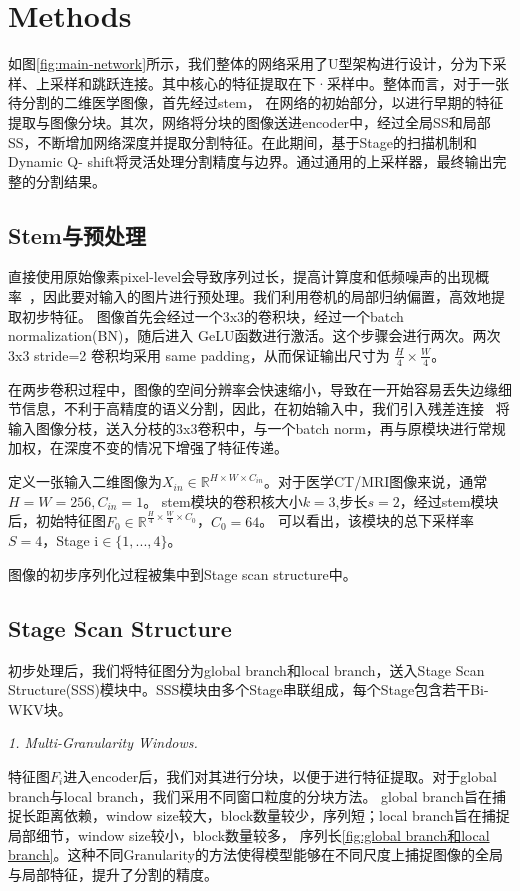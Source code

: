 \documentclass[conference]{IEEEtran}   %
\begin{document}
\section{Methods}
如图\ref{fig:main-network}所示，我们整体的网络采用了U型架构进行设计，分为下采样、上采样和跳跃连接。其中核心的特征提取在下·采样中。整体而言，对于一张待分割的二维医学图像，首先经过stem，
在网络的初始部分，以进行早期的特征提取与图像分块。其次，网络将分块的图像送进encoder中，经过全局SS和局部SS，不断增加网络深度并提取分割特征。在此期间，基于Stage的扫描机制和Dynamic Q-
shift将灵活处理分割精度与边界。通过通用的上采样器，最终输出完整的分割结果。
\subsection{Stem与预处理}
直接使用原始像素pixel-level会导致序列过长，提高计算度和低频噪声的出现概率~\cite{vit}，因此要对输入的图片进行预处理。我们利用卷机的局部归纳偏置，高效地提取初步特征。
图像首先会经过一个3x3的卷积块，经过一个batch normalization(BN)，随后进入
GeLU函数进行激活。这个步骤会进行两次。两次 3x3 stride=2 卷积均采用 same padding，从而保证输出尺寸为 $\frac{H}{4}\times\frac{W}{4}$。

在两步卷积过程中，图像的空间分辨率会快速缩小，导致在一开始容易丢失边缘细节信息，不利于高精度的语义分割，因此，在初始输入中，我们引入残差连接
~\cite{resnet}将输入图像分枝，送入分枝的3x3卷积中，与一个batch norm，再与原模块进行常规加权，在深度不变的情况下增强了特征传递。

定义一张输入二维图像为$X_{in} \in \mathbb{R}^{H \times W \times C_{in}}$。对于医学CT/MRI图像来说，通常$H=W=256, C_{in}=1$。
stem模块的卷积核大小$k=3$,步长$s=2$，经过stem模块后，初始特征图$F_{0} \in \mathbb{R}^{\frac{H}{4} \times \frac{W}{4} \times C_{0}}$，$C_{0}=64$。
可以看出，该模块的总下采样率 $S=4$，Stage $\text{i} \in \{1,...,4\}$。

图像的初步序列化过程被集中到Stage scan structure中。



\subsection{Stage Scan Structure}
初步处理后，我们将特征图分为global branch和local branch，送入Stage Scan Structure(SSS)模块中。SSS模块由多个Stage串联组成，每个Stage包含若干Bi-WKV块。

\textit{1. Multi-Granularity Windows.}

特征图$F_i$进入encoder后，我们对其进行分块，以便于进行特征提取。对于global branch与local branch，我们采用不同窗口粒度的分块方法。
global branch旨在捕捉长距离依赖，window size较大，block数量较少，序列短；local branch旨在捕捉局部细节，window size较小，block数量较多，
序列长\ref{fig:global branch和local branch}。这种不同Granularity的方法使得模型能够在不同尺度上捕捉图像的全局与局部特征，提升了分割的精度。
\end{document}
